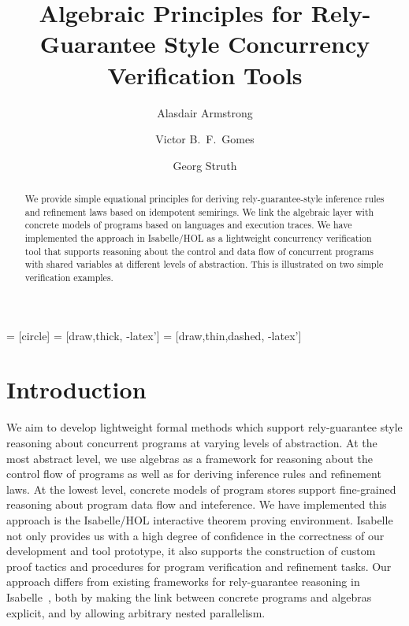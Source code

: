 \documentclass{llncs}
\begin{document}
 = [circle]
 = [draw,thick, -latex']
 = [draw,thin,dashed, -latex']

\title{Algebraic Principles for Rely-Guarantee Style Concurrency Verification Tools}

\author{Alasdair Armstrong \and Victor B.~F.~Gomes \and Georg Struth}


\maketitle

\begin{abstract}
  We provide simple equational principles for deriving
  rely-guarantee-style inference rules and refinement laws based on
  idempotent semirings. We link the algebraic layer with concrete
  models of programs based on languages and execution traces. We have
  implemented the approach in Isabelle/HOL as a lightweight
  concurrency verification tool that supports reasoning about the
  control and data flow of concurrent programs with shared variables
  at different levels of abstraction. This is illustrated on two
  simple verification examples.
\end{abstract}

\pagestyle{plain}

\section{Introduction}

We aim to develop lightweight formal methods which support
rely-guarantee style reasoning about concurrent programs at varying
levels of abstraction. At the most abstract level, we use algebras as
a framework for reasoning about the control flow of programs as well
as for deriving inference rules and refinement laws. At the lowest
level, concrete models of program stores support fine-grained
reasoning about program data flow and inteference. We have implemented
this approach is the Isabelle/HOL interactive theorem proving
environment. Isabelle not only provides us with a high degree of
confidence in the correctness of our development and tool prototype,
it also supports the construction of custom proof tactics and
procedures for program verification and refinement tasks. Our approach
differs from existing frameworks for rely-guarantee reasoning in
Isabelle~\cite{nieto_rely-guarantee_2003}, both by making the link
between concrete programs and algebras explicit, and by allowing
arbitrary nested parallelism.
\end{document}
